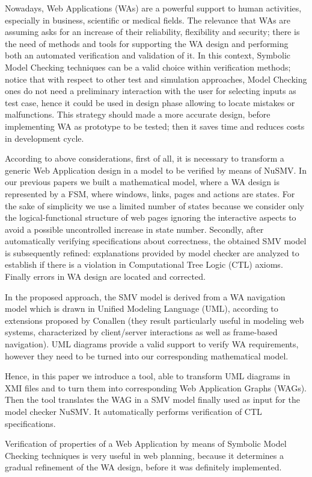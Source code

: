 Nowadays, Web Applications (WAs) are a powerful support to human activities, especially in business, scientific or medical fields. The relevance that WAs are assuming asks for an increase of their reliability, flexibility and security; there is the need of methods and tools for supporting the WA design and performing both an automated verification and validation of it.
In this context, Symbolic Model Checking techniques \cite{katoen} can be a valid choice within verification methods; notice that with respect to other test and simulation approaches, Model Checking ones do not need a preliminary interaction with the user for selecting inputs as test case, hence it could be used in design phase allowing to locate mistakes or malfunctions. This strategy should made a more accurate design, before implementing WA as prototype to be tested; then it saves time and reduces costs in development cycle.

According to above considerations, first of all, it is necessary to transform a generic Web Application design in a  model to be verified by means of NuSMV. In our previous papers \cite{seke-02}\cite{csmr-03}\cite{disc-doni-mong-tota-cast} we built a mathematical model, where a WA design is represented by a FSM, where windows, links, pages and actions are states. For the sake of simplicity we use a limited number of states because we consider only the logical-functional structure of web pages ignoring the interactive aspects to avoid a possible uncontrolled increase in state number. Secondly, after automatically verifying specifications about correctness, the obtained SMV model is subsequently refined: explanations provided by model checker are analyzed to establish if there is a violation in Computational Tree Logic (CTL) \cite{katoen} axioms. Finally errors in WA design are located and corrected.

In the proposed approach, the SMV model is derived from a WA navigation model which is drawn in Unified Modeling Language (UML), according to extensions proposed by Conallen \cite{cona-02} (they result particularly useful in modeling web systems, characterized by client/server interactions as well as frame-based navigation). UML diagrams provide a valid support to verify WA requirements, however they need to be turned into our corresponding mathematical model. 

Hence, in this paper we introduce a tool, able to transform UML diagrams in XMI files and to turn them into corresponding Web Application Graphs (WAGs). Then the tool translates the WAG in a SMV model finally used as input for the model checker NuSMV. It automatically performs verification of CTL specifications. 

Verification of properties of a Web Application by means of Symbolic Model Checking techniques is very useful in web planning, because it determines a gradual refinement of the WA design, before it was definitely implemented.